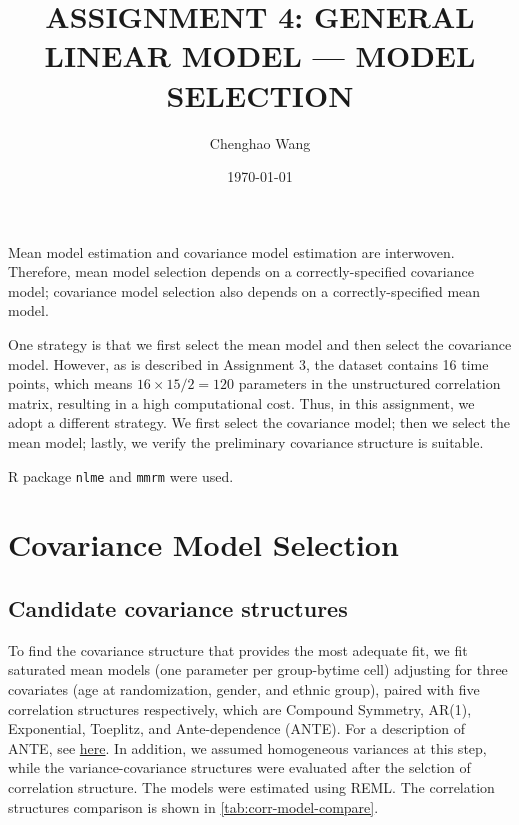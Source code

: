 \documentclass[12pt]{article}
\title{\Large\bfseries ASSIGNMENT 4: GENERAL LINEAR MODEL — MODEL SELECTION}
\author{Chenghao Wang}
\date{\today}
\begin{document}
\maketitle

Mean model estimation and covariance model estimation are interwoven.
Therefore, mean model selection depends on a correctly-specified
covariance model; covariance model selection also depends on a
correctly-specified mean model.

One strategy is that we first select the mean model and then select
the covariance model. However, 
as is described in Assignment 3,
the dataset contains 16 time points,
which means $16 \times 15 / 2 = 120$ parameters
in the unstructured correlation matrix, 
resulting in a high computational cost.
Thus, in this assignment, we adopt a different strategy.
We first select the covariance model;
then we select the mean model; lastly, we verify
the preliminary covariance structure is suitable.

R package \texttt{nlme} and \texttt{mmrm} were used.

\section{Covariance Model Selection}\label{sec:Covariance-Model-Selection}

\subsection{Candidate covariance structures}\label{subsec:candidate-covariance-structures}

To find the covariance structure that provides the most adequate fit,
we fit saturated mean models (one parameter per group-bytime cell) adjusting
for three covariates (age at randomization, gender, and ethnic group),
paired with five correlation structures respectively,
which are Compound Symmetry, AR(1), Exponential, Toeplitz, and Ante-dependence (ANTE).
For a description of ANTE, see
\href{https://cran.r-project.org/web/packages/mmrm/vignettes/covariance.html#homogeneous-ad-and-heterogeneous-ante-dependence-adh}{here}.
In addition, we assumed homogeneous variances at this step,
while the variance-covariance structures were evaluated
after the selction of correlation structure.
The models were estimated using REML.
The correlation structures comparison 
is shown in \cref{tab:corr-model-compare}.

\begin{table}[htbp]
\caption{Model comparison for candidate correlation structures}
\label{tab:corr-model-compare}
\centering
{}
\end{table}
\end{document}
